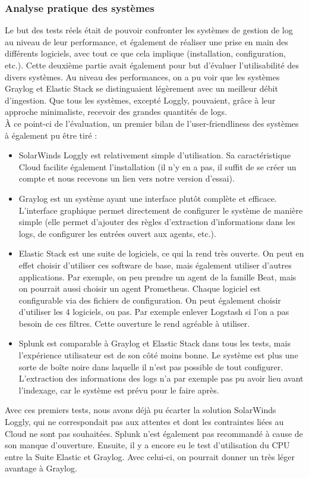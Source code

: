 \documentclass[paper=a4, fontsize=11pt]{scrartcl}
\begin{document}
\subsubsection{Analyse pratique des systèmes}
Le but des tests réels était de pouvoir confronter les systèmes de gestion de log au niveau de leur performance, et également de réaliser une prise en main des différents logiciels, avec tout ce que cela implique (installation, configuration, etc.). Cette deuxième partie avait également pour but d'évaluer l'utilisabilité des divers systèmes.
Au niveau des performances, on a pu voir que les systèmes Graylog et Elastic Stack se distinguaient légèrement avec un meilleur débit d'ingestion. Que tous les systèmes, excepté Loggly, pouvaient, grâce à leur approche minimaliste, recevoir des grandes quantités de logs.\\
À ce point-ci de l'évaluation, un premier bilan de l'\og user-friendliness \fg des systèmes à également pu être tiré :
\begin{itemize}
    \item SolarWinds Loggly est relativement simple d'utilisation. Sa caractéristique Cloud facilite également l'installation (il n'y en a pas, il suffit de se créer un compte et nous recevons un lien vers notre version d'essai).
    \item Graylog est un système ayant une interface plutôt complète et efficace. L'interface graphique permet directement de configurer le système de manière simple (elle permet d'ajouter des règles d'extraction d'informations dans les logs, de configurer les entrées ouvert aux agents, etc.).
    \item Elastic Stack est une \og suite \fg de logiciels, ce qui la rend très ouverte. On peut en effet choisir d'utiliser ces software de base, mais également utiliser d'autres applications. Par exemple, on peu prendre un agent de la famille Beat, mais on pourrait aussi choisir un agent Prometheus. Chaque logiciel est configurable via des fichiers de configuration. On peut également choisir d'utiliser les 4 logiciels, ou pas. Par exemple enlever Logstash si l'on a pas besoin de ces filtres. Cette ouverture le rend agréable à utiliser.
    \item Splunk est comparable à Graylog et Elastic Stack dans tous les tests, mais l'expérience utilisateur est de son côté moins bonne. Le système est plus une sorte de \og boîte noire \fg dans laquelle il n'est pas possible de tout configurer. L'extraction des informations des logs n'a par exemple pas pu avoir lieu avant l'indexage, car le système est prévu pour le faire après.
\end{itemize}
Avec ces premiers tests, nous avons déjà pu écarter la solution SolarWinds Loggly, qui ne correspondait pas aux attentes et dont les contraintes liées au Cloud ne sont pas souhaitées. Splunk n'est également pas recommandé à cause de son manque d'ouverture.
Ensuite, il y a encore eu le test d'utilisation du CPU entre la Suite Elastic et Graylog. Avec celui-ci, on pourrait donner un très léger avantage à Graylog.
\end{document}
